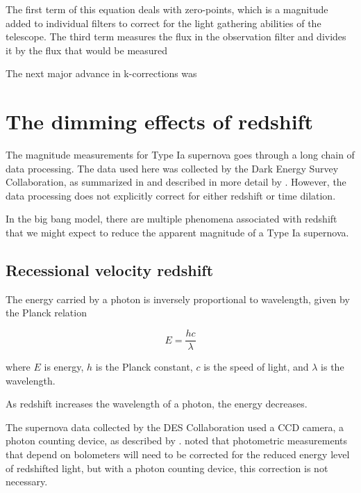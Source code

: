 \documentclass{article}
\begin{document}
The first term of this equation deals with zero-points, which is a magnitude
added to individual filters to correct for the light gathering abilities of the
telescope. The third term measures the flux in the observation filter and divides it by  the flux that would be measured 


The next major advance in k-corrections was

\citet{snpy}

\begin{minipage}[c]{0.95\textwidth}

\end{minipage}

\section{The dimming effects of redshift}
\label{sec:redshift}

The magnitude measurements for Type Ia supernova goes through a long chain of
data processing. The data used here was collected by the Dark Energy Survey
Collaboration, as summarized in \citet{abbott2024} and described in more detail
by \citet{vincenzi2024}. However, the data processing does not explicitly
correct for either redshift or time dilation.

In the big bang model, there are multiple phenomena associated with redshift that we
might expect to reduce the apparent magnitude of a Type Ia supernova.

\subsection{Recessional velocity redshift}

The energy carried by a photon is inversely proportional to wavelength, given
by the Planck relation

\begin{equation}
  E = \frac{hc}{\lambda}
\end{equation}

where $E$ is energy, $h$ is the Planck constant, $c$ is the speed of light, and
$\lambda$ is the wavelength.

As redshift increases the wavelength of a photon, the energy decreases.

The supernova data collected by the DES Collaboration used a CCD camera, a
photon counting device, as described by \citet{flaugher2015}.  \citet{kim1996}
noted that photometric measurements that depend on bolometers will need to be
corrected for the reduced energy level of redshifted light, but with a photon
counting device, this correction is not necessary.
\end{document}
